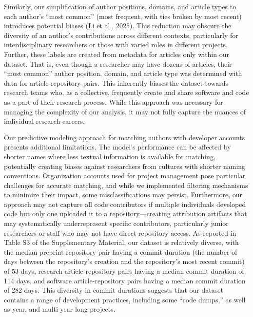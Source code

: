 \documentclass[
  number,
  3p,
  onecolumn]{elsarticle}
\begin{document}
Similarly, our simplification of author positions, domains, and article
types to each author's ``most common'' (most frequent, with ties broken
by most recent) introduces potential biases (Li et al., 2025). This
reduction may obscure the diversity of an author's contributions across
different contexts, particularly for interdisciplinary researchers or
those with varied roles in different projects. Further, these labels are
created from metadata for articles only within our dataset. That is,
even though a researcher may have dozens of articles, their ``most
common'' author position, domain, and article type was determined with
data for article-repository pairs. This inherently biases the dataset
towards research teams who, as a collective, frequently create and share
software and code as a part of their research process. While this
approach was necessary for managing the complexity of our analysis, it
may not fully capture the nuances of individual research careers.

Our predictive modeling approach for matching authors with developer
accounts presents additional limitations. The model's performance can be
affected by shorter names where less textual information is available
for matching, potentially creating biases against researchers from
cultures with shorter naming conventions. Organization accounts used for
project management pose particular challenges for accurate matching, and
while we implemented filtering mechanisms to minimize their impact, some
misclassifications may persist. Furthermore, our approach may not
capture all code contributors if multiple individuals developed code but
only one uploaded it to a repository---creating attribution artifacts
that may systematically underrepresent specific contributors,
particularly junior researchers or staff who may not have direct
repository access. As reported in Table S3 of the Supplementary
Material, our dataset is relatively diverse, with the median
preprint-repository pair having a commit duration (the number of days
between the repository's creation and the repository's most recent
commit) of 53 days, research article-repository pairs having a median
commit duration of 114 days, and software article-repository pairs
having a median commit duration of 282 days. This diversity in commit
durations suggests that our dataset contains a range of development
practices, including some ``code dumps,'' as well as year, and
multi-year long projects.
\end{document}
